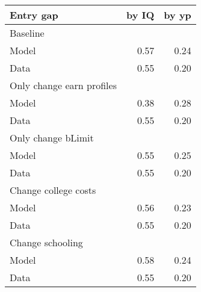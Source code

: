 \begin{tabular}{lrr}
\hline
Entry gap & by IQ  & by yp  \\
\hline
Baseline &   &   \\
Model & 0.57  & 0.24  \\
Data & 0.55  & 0.20  \\
Only change earn profiles &   &   \\
Model & 0.38  & 0.28  \\
Data & 0.55  & 0.20  \\
Only change bLimit &   &   \\
Model & 0.55  & 0.25  \\
Data & 0.55  & 0.20  \\
Change college costs &   &   \\
Model & 0.56  & 0.23  \\
Data & 0.55  & 0.20  \\
Change schooling &   &   \\
Model & 0.58  & 0.24  \\
Data & 0.55  & 0.20  \\
\hline
\end{tabular}%
